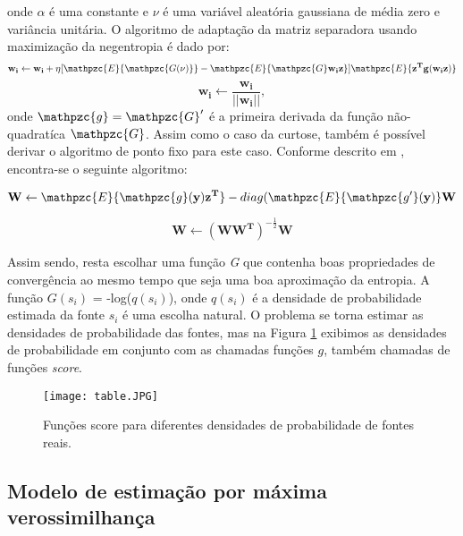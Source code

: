     onde $\alpha$ é uma constante e $\nu$ é uma variável aleatória gaussiana de média zero e variância unitária.  O algoritmo de adaptação da matriz separadora usando maximização da negentropia é dado por:
    \begin{equation}
          \mathbf{w_i} \leftarrow  \mathbf{w_i} + \eta[\mathpzc{E}\{\mathpzc{G(\nu)}\} - \mathpzc{E}\{\mathpzc{G}\mathbf{w_iz}\}]\mathpzc{E}\{\mathbf{z^Tg(w_iz)}\}
    \end{equation}
    \begin{equation}
          \mathbf{w_i} \leftarrow  \frac{\mathbf{w_i}}{||\mathbf{w_i}||},
    \end{equation}
    onde $\mathpzc{g} = \mathpzc{G}'$ é a primeira derivada da função não-quadratíca $\mathpzc{G}$.
    Assim como o caso da curtose, também é possível derivar o algoritmo de ponto fixo para este caso. Conforme descrito em \cite{LuizVictorio}, encontra-se o seguinte algoritmo:
    
    \begin{equation}
        \mathbf{W} \leftarrow \mathpzc{E}\{\mathpzc{g}\mathbf{(y)z^T}\} - diag(\mathpzc{E}\{\mathpzc{g'}\mathbf{(y)}\}\mathbf{W}
    \end{equation}
    
    \begin{equation}
        \mathbf{W} \leftarrow (\mathbf{WW^T})^{-\frac{1}{2}}\mathbf{W}
    \end{equation}
    
    
    Assim sendo, resta escolhar uma função \textit{G} que contenha boas propriedades de convergência ao mesmo tempo que seja uma boa aproximação da entropia. A função $G(s_i)$ = -log($q(s_i)$), onde $q(s_i)$ é a densidade de probabilidade estimada da fonte $s_i$ é uma escolha natural. O problema se torna estimar as densidades de probabilidade das fontes, mas na Figura \ref{fig:scoretable} exibimos as densidades de probabilidade em conjunto com as chamadas funções $g$, também chamadas de funções \textit{score}.
    
    \begin{figure}
        \centering
        \texttt{[image: table.JPG]}
        \caption{Funções score para diferentes densidades de probabilidade de fontes reais.}
        \label{fig:scoretable}
    \end{figure}
    
\subsection{Modelo de estimação por máxima verossimilhança}

